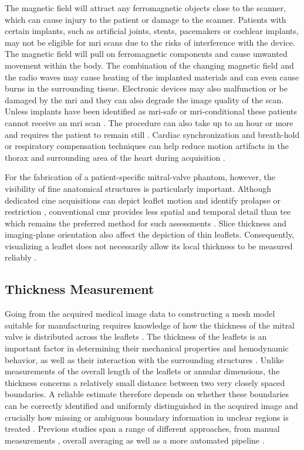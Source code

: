The magnetic field will attract any ferromagnetic objects close to the scanner, which can cause injury to the patient or damage to the scanner. Patients with certain implants, such as artificial joints, stents, pacemakers or cochlear implants, may not be eligible for \gls{mri} scans due to the risks of interference with the device. The magnetic field will pull on ferromagnetic components and cause unwanted movement within the body. The combination of the changing magnetic field and the radio waves may cause heating of the implanted materials and can even cause burns in the surrounding tissue. Electronic devices may also malfunction or be damaged by the \gls{mri} and they can also degrade the image quality of the scan. Unless implants have been identified as \gls{mri}-safe or \gls{mri}-conditional these patients cannot receive an \gls{mri} scan \cite{fda_mri_benefits}. The procedure can also take up to an hour or more and requires the patient to remain still \cite{mayo2023mri}. Cardiac synchronization and breath-hold or respiratory compensation techniques can help reduce motion artifacts in the thorax and surrounding area of the heart during acquisition \cite{ferreira2013cardiovascular}. 

For the fabrication of a patient-specific mitral-valve phantom, however, the visibility of fine anatomical structures is particularly important. Although dedicated cine acquisitions can depict leaflet motion and identify prolapse or restriction \cite{gulsin2017cardiovascular}, conventional \gls{cmr} provides less spatial and temporal detail than \gls{tee} which remains the preferred method for such assessments \cite{figliozzi2025cardiovascular}. Slice thickness and imaging-plane orientation also affect the depiction of thin leaflets. Consequently, visualizing a leaflet does not necessarily allow its local thickness to be measured reliably \cite{gulsin2017cardiovascular}.

\subsection{Thickness Measurement}\label{subsec:measurement}
Going from the acquired medical image data to constructing a mesh model suitable for manufacturing requires knowledge of how the thickness of the mitral valve is distributed across the leaflets \cite{vukicevic2022development}. The thickness of the leaflets is an important factor in determining their mechanical properties and hemodynamic behavior, as well as their interaction with the surrounding structures \cite{lin2023impact}. Unlike measurements of the overall length of the leaflets or annular dimensions, the thickness concerns a relatively small distance between two very closely spaced boundaries. A reliable estimate therefore depends on whether these boundaries can be correctly identified and uniformly distinguished in the acquired image and crucially how missing or ambiguous boundary information in unclear regions is treated \cite{xia2018signal}. Previous studies span a range of different approaches, from manual measurements \cite{hunter2020screening}, overall averaging \cite{el2021valve} as well as a more automated pipeline \cite{lopes2023using}. 

